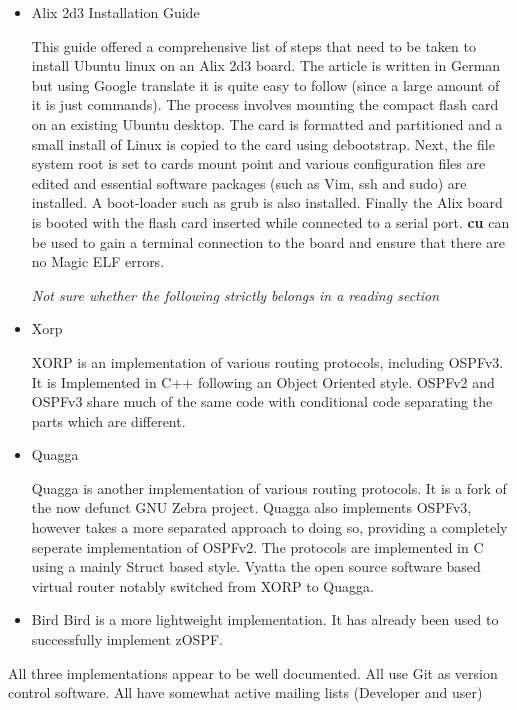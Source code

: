 \documentclass[12pt]{report}
\begin{document}
	\begin{itemize}

	\item Alix 2d3 Installation Guide

	This guide offered a comprehensive list of steps that need to be taken
	to install Ubuntu linux on an Alix 2d3 board.  The article is written in
	German but using Google translate it is quite easy to follow (since a
	large amount of it is just commands).  The process involves mounting the
	compact flash card on an existing Ubuntu desktop.  The card is formatted
	and partitioned and a small install of Linux is copied to the card using
	debootstrap.  Next, the file system root is set to cards mount point and
	various configuration files are edited and essential software packages
	(such as Vim, ssh and sudo) are installed. A boot-loader such as grub is
	also installed.  Finally the Alix board is booted with the flash card
	inserted while connected to a serial port.  {\bf cu} can be used to gain
	a terminal connection to the board and ensure that there are no Magic
	ELF errors. 

	\em Not sure whether the following strictly belongs in a reading section
	\em

	\item Xorp
	
	XORP is an implementation of various routing protocols, including
	OSPFv3.  It is Implemented in C++ following an Object Oriented style.
	OSPFv2 and OSPFv3 share much of the same code with conditional code
	separating the parts which are different.
	
	\item Quagga
	
	Quagga is another implementation of various routing protocols.  It is a
	fork of the now defunct GNU Zebra project.  Quagga also implements
	OSPFv3, however takes a more separated approach to doing so, providing a
	completely seperate implementation of OSPFv2. 	The protocols are
	implemented in C using a mainly Struct based style.  Vyatta the open
	source software based virtual router notably switched from XORP to
	Quagga. 

	\item Bird
	Bird is a more lightweight implementation.  It has already been used to
	successfully implement zOSPF.

\end{itemize}

	All three implementations appear to be well documented.  All use Git as
	version control software.  All have somewhat active mailing lists
	(Developer and user)
\end{document}
